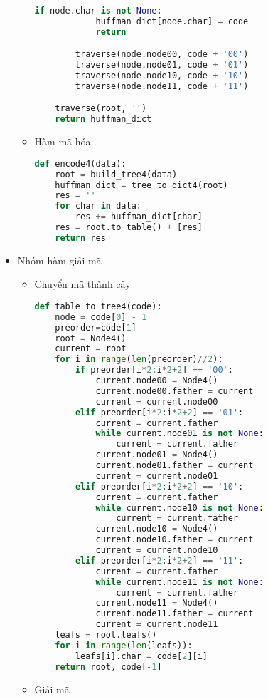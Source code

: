 \begin{itemize}
\begin{itemize}
\begin{lstlisting}[language=Python]
        if node.char is not None:
            huffman_dict[node.char] = code
            return

        traverse(node.node00, code + '00')
        traverse(node.node01, code + '01')
        traverse(node.node10, code + '10')
        traverse(node.node11, code + '11')

    traverse(root, '')
    return huffman_dict
\end{lstlisting}
\item Hàm mã hóa
\begin{lstlisting}[language=Python]
def encode4(data):
    root = build_tree4(data)
    huffman_dict = tree_to_dict4(root)
    res = ''
    for char in data:
        res += huffman_dict[char]
    res = root.to_table() + [res]
    return res
\end{lstlisting}
\end{itemize}
\item Nhóm hàm giải mã
\begin{itemize}
    \item Chuyển mã thành cây
\begin{lstlisting}[language=Python]
def table_to_tree4(code):
    node = code[0] - 1
    preorder=code[1]
    root = Node4()
    current = root
    for i in range(len(preorder)//2):
        if preorder[i*2:i*2+2] == '00':
            current.node00 = Node4()
            current.node00.father = current
            current = current.node00
        elif preorder[i*2:i*2+2] == '01':
            current = current.father
            while current.node01 is not None:
                current = current.father
            current.node01 = Node4()
            current.node01.father = current
            current = current.node01
        elif preorder[i*2:i*2+2] == '10':
            current = current.father
            while current.node10 is not None:
                current = current.father
            current.node10 = Node4()
            current.node10.father = current
            current = current.node10
        elif preorder[i*2:i*2+2] == '11':
            current = current.father
            while current.node11 is not None:
                current = current.father
            current.node11 = Node4()
            current.node11.father = current
            current = current.node11
    leafs = root.leafs()
    for i in range(len(leafs)):
        leafs[i].char = code[2][i]
    return root, code[-1]
\end{lstlisting}
\item Giải mã
\begin{lstlisting}[language=Python]

\end{lstlisting}
\end{itemize}
\end{itemize}

